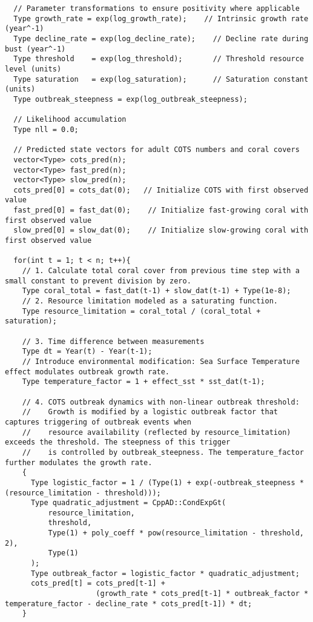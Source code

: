 \begin{lstlisting}
  // Parameter transformations to ensure positivity where applicable
  Type growth_rate = exp(log_growth_rate);    // Intrinsic growth rate (year^-1)
  Type decline_rate = exp(log_decline_rate);    // Decline rate during bust (year^-1)
  Type threshold    = exp(log_threshold);       // Threshold resource level (units)
  Type saturation   = exp(log_saturation);      // Saturation constant (units)
  Type outbreak_steepness = exp(log_outbreak_steepness);

  // Likelihood accumulation
  Type nll = 0.0;

  // Predicted state vectors for adult COTS numbers and coral covers
  vector<Type> cots_pred(n);
  vector<Type> fast_pred(n);
  vector<Type> slow_pred(n);
  cots_pred[0] = cots_dat(0);   // Initialize COTS with first observed value
  fast_pred[0] = fast_dat(0);    // Initialize fast-growing coral with first observed value
  slow_pred[0] = slow_dat(0);    // Initialize slow-growing coral with first observed value

  for(int t = 1; t < n; t++){
    // 1. Calculate total coral cover from previous time step with a small constant to prevent division by zero.
    Type coral_total = fast_dat(t-1) + slow_dat(t-1) + Type(1e-8);
    // 2. Resource limitation modeled as a saturating function.
    Type resource_limitation = coral_total / (coral_total + saturation);

    // 3. Time difference between measurements
    Type dt = Year(t) - Year(t-1);
    // Introduce environmental modification: Sea Surface Temperature effect modulates outbreak growth rate.
    Type temperature_factor = 1 + effect_sst * sst_dat(t-1);

    // 4. COTS outbreak dynamics with non-linear outbreak threshold:
    //    Growth is modified by a logistic outbreak factor that captures triggering of outbreak events when
    //    resource availability (reflected by resource_limitation) exceeds the threshold. The steepness of this trigger
    //    is controlled by outbreak_steepness. The temperature_factor further modulates the growth rate.
    {
      Type logistic_factor = 1 / (Type(1) + exp(-outbreak_steepness * (resource_limitation - threshold)));
      Type quadratic_adjustment = CppAD::CondExpGt(
          resource_limitation,
          threshold,
          Type(1) + poly_coeff * pow(resource_limitation - threshold, 2),
          Type(1)
      );
      Type outbreak_factor = logistic_factor * quadratic_adjustment;
      cots_pred[t] = cots_pred[t-1] +
                     (growth_rate * cots_pred[t-1] * outbreak_factor * temperature_factor - decline_rate * cots_pred[t-1]) * dt;
    }


\end{lstlisting}
